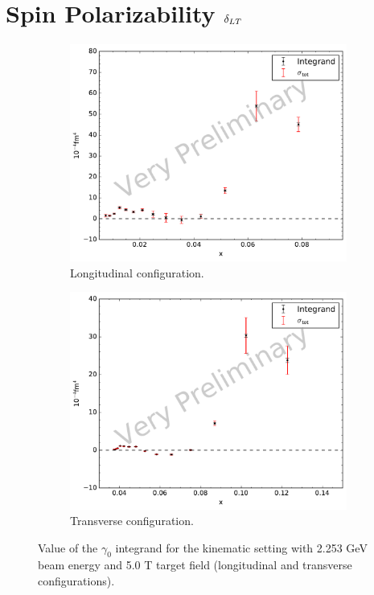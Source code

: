 \section{\texorpdfstring{Spin Polarizability $\delta_{LT}$}{Spin Polarizability delta\_\{LT\}}}
\label{C8S5}

\begin{figure}[p!]
  \centering
  \begin{subfigure}[t]{0.79\textwidth}
    \includegraphics[width=\textwidth]{figs/gamma0-model-22535000.pdf}
    \caption{Longitudinal configuration. \label{C8S5F1a}}
  \end{subfigure}
  \begin{subfigure}[t]{0.79\textwidth}
    \includegraphics[width=\textwidth]{figs/gamma0-model-22535090.pdf}
    \caption{Transverse configuration. \label{C8S5F1b}}
  \end{subfigure}
  \caption[$\gamma_0$ integrand with $E=2.253$ GeV and $B=5.0$ T.]{Value of the $\gamma_0$ integrand for the kinematic setting with 2.253 GeV beam energy and 5.0 T target field (longitudinal and transverse configurations). \label{C8S5F1}}
\end{figure}

